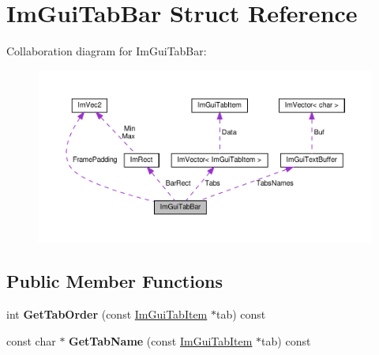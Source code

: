 \hypertarget{structImGuiTabBar}{}\section{Im\+Gui\+Tab\+Bar Struct Reference}
\label{structImGuiTabBar}


Collaboration diagram for Im\+Gui\+Tab\+Bar\+:\nopagebreak
\begin{figure}[H]
\begin{center}
\leavevmode
\includegraphics[width=350pt]{structImGuiTabBar__coll__graph}
\end{center}
\end{figure}
\subsection*{Public Member Functions}
\begin{DoxyCompactItemize}
\item 
\mbox{\label{structImGuiTabBar_aced33dc6164509331b3430239bd7dcbd}} 
int {\bfseries Get\+Tab\+Order} (const \hyperlink{structImGuiTabItem}{Im\+Gui\+Tab\+Item} $\ast$tab) const
\item 
\mbox{\label{structImGuiTabBar_a9296111fbd2316f354ca4bf952a09b93}} 
const char $\ast$ {\bfseries Get\+Tab\+Name} (const \hyperlink{structImGuiTabItem}{Im\+Gui\+Tab\+Item} $\ast$tab) const
\end{DoxyCompactItemize}

